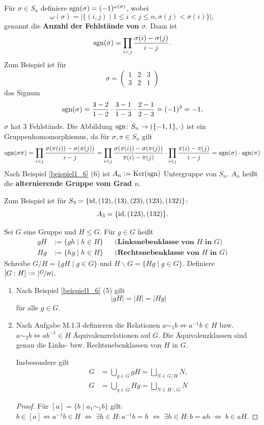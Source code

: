 \begin{beispiel}\label{beispiel1_8}
	Für $\sigma \in S_n$ definiere $\mathrm{sgn}(\sigma) = (-1)^{\omega(\sigma)}$, wobei 
	\[\omega(\sigma) = \left|\{(i,j) \mid 1 \leq i < j \leq n, \sigma(j) < \sigma(i)\}\right|,\]
	genannt die \textbf{Anzahl der Fehlstände von $\sigma$}. Dann ist
	\[\mathrm{sgn}(\sigma) = \prod_{i < j} \frac{\sigma(i) - \sigma(j)}{i - j}.\]
	Zum Beispiel ist für 
	\[\sigma = \begin{pmatrix}
		1 & 2 & 3 \\
		3 & 2 & 1
	\end{pmatrix}\]
	das Signum
	\[\mathrm{sgn}(\sigma) = \frac{3-2}{1-2} \cdot \frac{3-1}{1-3} \cdot \frac{2-1}{2-3} = (-1)^3 = -1.\]
	$\sigma$ hat 3 Fehlstände. Die Abbildung $\mathrm{sgn} \colon S_n \to (\{-1, 1\}, \cdot)$ ist ein Gruppenhomomorphismus, da für $\sigma, \pi \in S_n$ gilt
	\[\mathrm{sgn}(\sigma \pi) = \prod_{i < j} \frac{\sigma(\pi(i)) - \sigma(\pi(j))}{i - j} = \prod_{i < j} \frac{\sigma(\pi(i)) - \sigma(\pi(j))}{\pi(i) - \pi(j)} \cdot \prod_{i < j} \frac{\pi(i) - \pi(j)}{i - j} = \mathrm{sgn}(\sigma) \cdot \mathrm{sgn}(\pi)\]
	Nach Beispiel \ref{beispiel1_6} (6) ist $A_n := \mathrm{Ker}(\mathrm{sgn})$ Untergruppe von $S_n$. $A_n$ heißt die \textbf{alternierende Gruppe vom Grad $n$}.
	
	Zum Beispiel ist für $S_3 = \{\mathrm{id}, (12), (13), (23), (123), (132)\}$: 
	\[A_3 = \{\mathrm{id}, (123), (132)\}.\]
\end{beispiel}
\begin{definition}
	Sei $G$ eine Gruppe und $H \leq G$. Für $g \in G$ heißt
	\begin{align*}
		gH &:= \{gh \mid h \in H\} &&\textbf{(Linksnebenklasse von $H$ in $G$)}\\
		Hg &:= \{hg \mid h \in H\} &&\textbf{(Rechtsnebenklasse von $H$ in $G$)}
	\end{align*}
	Schreibe $G / H = \{gH \mid g \in G\}$ und $H \backslash G = \{Hg \mid g \in G\}$. Definiere $[G : H] := \left|\sfrac{G}{H}\right|$.
\end{definition}
\begin{rem}
	\begin{enumerate}[label=(\roman*)]
		\item Nach Beispiel \ref{beispiel1_6} (5) gilt
		\[|gH| = |H| = |Hg|\]
		für alle $g \in G$.
		\item Nach Aufgabe M.1.3 definieren die Relationen $a \sim_1 b \Leftrightarrow a^{-1}b \in H$ bzw. $a \sim_2 b \Leftrightarrow ab^{-1} \in H$ Äquivalenzrelationen auf $G$. Die Äquivalenzklassen sind genau die Links- bzw. Rechtsnebenklassen von $H$ in $G$.
		
		Insbesondere gilt 
		\begin{align*}
			G &= \bigcup_{g \in G} gH = \bigsqcup_{N \in G/H} N,\\
			G &= \bigcup_{g \in G} Hg = \bigsqcup_{N \in H \backslash G} N
		\end{align*}
		\begin{proof}
			Für $[a] = \{b \mid a_1 \sim_1 b\}$ gilt: $b \in [a] \Leftrightarrow a^{-1}b \in H \;\Leftrightarrow\; \exists h \in H : a^{-1}b = h \;\Leftrightarrow\; \exists h \in H : b = ah \;\Leftrightarrow\; b \in aH$.
		\end{proof}
	\end{enumerate}
\end{rem}
